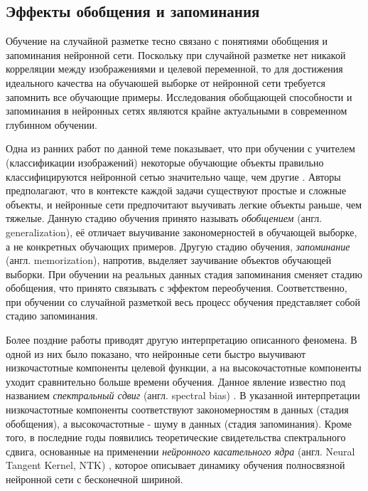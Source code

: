 \subsection{Эффекты обобщения и запоминания}

Обучение на случайной разметке тесно связано с понятиями обобщения и  запоминания нейронной сети. Поскольку при случайной разметке нет никакой корреляции между изображениями и целевой переменной, то для достижения идеального качества на обучаюшей выборке от нейронной сети требуется запомнить все обучающие примеры. Исследования обобщающей способности и запоминания в нейронных сетях являются крайне актуальными в современном глубинном обучении.

Одна из ранних работ по данной теме показывает, что при обучении с учителем (классификации изображений) некоторые обучающие объекты правильно классифицируются нейронной сетью значительно чаще, чем другие \cite{memorization}. Авторы предполагают, что в контексте каждой задачи существуют простые и сложные объекты, и нейронные сети предпочитают выучивать легкие объекты раньше, чем тяжелые. Данную стадию обучения принято называть \textit{обобщением} (англ. generalization), её отличает выучивание закономерностей в обучающей выборке, а не конкретных обучающих примеров. Другую стадию обучения, \textit{запоминание} (англ. memorization), напротив, выделяет заучивание объектов обучающей выборки. При обучении на реальных данных стадия запоминания сменяет стадию обобщения, что принято связывать с эффектом переобучения. Соответственно, при обучении со случайной разметкой весь процесс обучения представляет собой стадию запоминания.

Более поздние работы приводят другую интерпретацию описанного феномена. В одной из них \cite{frequency} было показано, что нейронные сети быстро выучивают низкочастотные компоненты целевой функции, а на высокочастотные компоненты уходит сравнительно больше времени обучения. Данное явление известно под названием \textit{спектральный сдвиг} (англ. spectral bias) \cite{spectralbias}. В указанной интерпретации низкочастотные компоненты соответствуют закономерностям в данных (стадия обобщения), а высокочастотные - шуму в данных (стадия запоминания). Кроме того, в последние годы появились теоретические свидетельства \cite{freqbias} спектрального сдвига, основанные на применении \textit{нейронного касательного ядра} (англ. Neural Tangent Kernel, NTK) \cite{ntk}, которое описывает динамику обучения полносвязной нейронной сети с бесконечной шириной.

